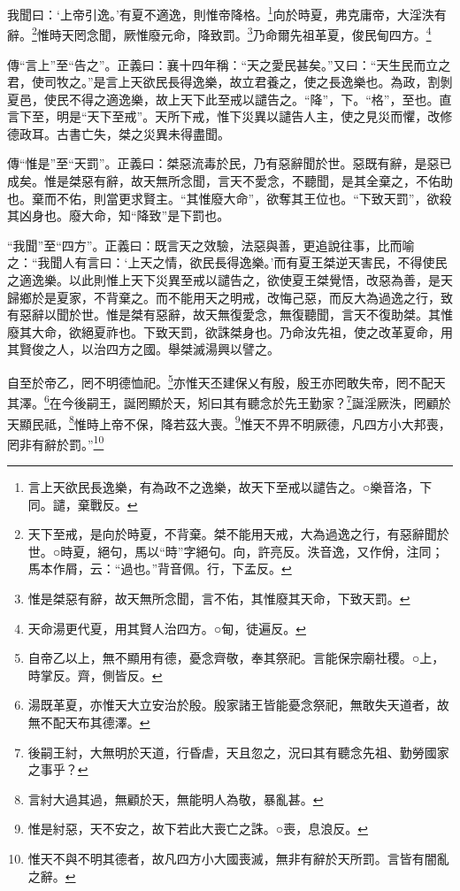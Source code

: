 我聞曰：‘上帝引逸。’有夏不適逸，則惟帝降格。\footnote{言上天欲民長逸樂，有為政不之逸樂，故天下至戒以譴告之。○樂音洛，下同。譴，棄戰反。}向於時夏，弗克庸帝，大淫泆有辭。\footnote{天下至戒，是向於時夏，不背棄。桀不能用天戒，大為過逸之行，有惡辭聞於世。○時夏，絕句，馬以“時”字絕句。向，許亮反。泆音逸，又作佾，注同；馬本作屑，云：“過也。”背音佩。行，下孟反。}惟時天罔念聞，厥惟廢元命，降致罰。\footnote{惟是桀惡有辭，故天無所念聞，言不佑，其惟廢其天命，下致天罰。}乃命爾先祖革夏，俊民甸四方。\footnote{天命湯更代夏，用其賢人治四方。○甸，徒遍反。}


{\noindent\zhuan{}\fzbyks 傳“言上”至“告之”。正義曰：襄十四年稱：“天之愛民甚矣。”又曰：“天生民而立之君，使司牧之。”是言上天欲民長得逸樂，故立君養之，使之長逸樂也。為政，割剝夏邑，使民不得之適逸樂，故上天下此至戒以譴告之。“降”，下。“格”，至也。直言下至，明是“天下至戒”。天所下戒，惟下災異以譴告人主，使之見災而懼，改修德政耳。古書亡失，桀之災異未得盡聞。 \par}

{\noindent\zhuan{}\fzbyks 傳“惟是”至“天罰”。正義曰：桀惡流毒於民，乃有惡辭聞於世。惡既有辭，是惡已成矣。惟是桀惡有辭，故天無所念聞，言天不愛念，不聽聞，是其全棄之，不佑助也。棄而不佑，則當更求賢主。“其惟廢大命”，欲奪其王位也。“下致天罰”，欲殺其凶身也。廢大命，知“降致”是下罰也。 \par}

{\noindent\shu{}\fzkt “我聞”至“四方”。正義曰：既言天之效驗，法惡與善，更追說往事，比而喻之：“我聞人有言曰：‘上天之情，欲民長得逸樂。’而有夏王桀逆天害民，不得使民之適逸樂。以此則惟上天下災異至戒以譴告之，欲使夏王桀覺悟，改惡為善，是天歸鄉於是夏家，不背棄之。而不能用天之明戒，改悔己惡，而反大為過逸之行，致有惡辭以聞於世。惟是桀有惡辭，故天無復愛念，無復聽聞，言天不復助桀。其惟廢其大命，欲絕夏祚也。下致天罰，欲誅桀身也。乃命汝先祖，使之改革夏命，用其賢俊之人，以治四方之國。舉桀滅湯興以譬之。 \par}

自至於帝乙，罔不明德恤祀。\footnote{自帝乙以上，無不顯用有德，憂念齊敬，奉其祭祀。言能保宗廟社稷。○上，時掌反。齊，側皆反。}亦惟天丕建保乂有殷，殷王亦罔敢失帝，罔不配天其澤。\footnote{湯既革夏，亦惟天大立安治於殷。殷家諸王皆能憂念祭祀，無敢失天道者，故無不配天布其德澤。}在今後嗣王，誕罔顯於天，矧曰其有聽念於先王勤家？\footnote{後嗣王紂，大無明於天道，行昏虐，天且忽之，況曰其有聽念先祖、勤勞國家之事乎？}誕淫厥泆，罔顧於天顯民祗，\footnote{言紂大過其過，無顧於天，無能明人為敬，暴亂甚。}惟時上帝不保，降若茲大喪。\footnote{惟是紂惡，天不安之，故下若此大喪亡之誅。○喪，息浪反。}惟天不畀不明厥德，凡四方小大邦喪，罔非有辭於罰。”\footnote{惟天不與不明其德者，故凡四方小大國喪滅，無非有辭於天所罰。言皆有闇亂之辭。}


